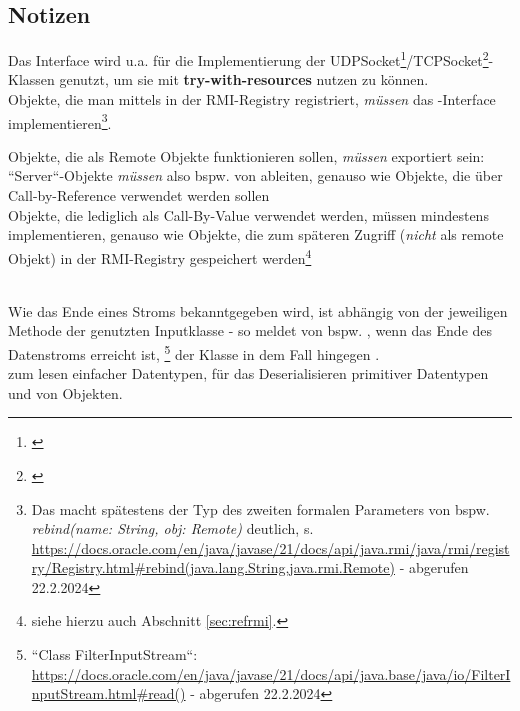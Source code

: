 \subsection{Notizen}
Das Interface  wird u.a. für die Implementierung der UDPSocket\footnote{\cite[269, Listing 5.1]{Oec22}}/TCPSocket\footnote{\cite[286, Listing 5.7]{Oec22}}-Klassen genutzt, um sie mit \textbf{try-with-resources} nutzen zu können.\\

\noindent
Objekte, die man mittels   in der RMI-Registry registriert, \textit{müssen} das -Interface implementieren\footnote{
Das macht spätestens der Typ des zweiten formalen Parameters von bspw. \textit{rebind(name: String, obj: Remote)} deutlich, s. \url{https://docs.oracle.com/en/java/javase/21/docs/api/java.rmi/java/rmi/registry/Registry.html#rebind(java.lang.String,java.rmi.Remote)} - abgerufen 22.2.2024
}.

\begin{tcolorbox}
Objekte, die als Remote Objekte funktionieren sollen, \textit{müssen} exportiert sein: ``Server``-Objekte \textit{müssen} also bspw. von  ableiten, genauso wie Objekte, die über Call-by-Reference verwendet werden sollen\\

    \noindent
    Objekte, die lediglich als Call-By-Value verwendet werden, müssen mindestens  implementieren, genauso wie Objekte, die zum späteren Zugriff (\textit{nicht} als remote Objekt) in der RMI-Registry gespeichert werden\footnote{
        siehe hierzu auch Abschnitt \ref{sec:refrmi}.
}
\end{tcolorbox}\\

\noindent
Wie das Ende eines Stroms bekanntgegeben wird, ist abhängig von der jeweiligen Methode der genutzten Inputklasse - so meldet  von  bspw. , wenn das Ende des Datenstroms erreicht ist, \footnote{
    ``Class FilterInputStream``: \url{https://docs.oracle.com/en/java/javase/21/docs/api/java.base/java/io/FilterInputStream.html#read()} - abgerufen 22.2.2024
} der Klasse  in dem Fall hingegen .\\

\noindent
{} zum lesen einfacher Datentypen,  für das Deserialisieren primitiver Datentypen und von Objekten.\\

